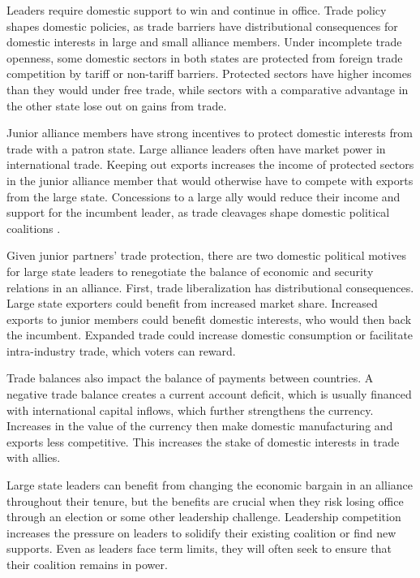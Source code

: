 \documentclass[12pt]{article}
\begin{document}
Leaders require domestic support to win and continue in office.
Trade policy shapes domestic policies, as trade barriers have distributional consequences for domestic interests in large and small alliance members.
Under incomplete trade openness, some domestic sectors in both states are protected from foreign trade competition by tariff or non-tariff barriers. 
Protected sectors have higher incomes than they would under free trade, while sectors with a comparative advantage in the other state lose out on gains from trade. 


Junior alliance members have strong incentives to protect domestic interests from trade with a patron state. 
Large alliance leaders often have market power in international trade. 
Keeping out exports increases the income of protected sectors in the junior alliance member that would otherwise have to compete with exports from the large state.
Concessions to a large ally would reduce their income and support for the incumbent leader, as trade cleavages shape domestic political coalitions \citep{Rogowski1987, Hiscox2001}. 


Given junior partners' trade protection, there are two domestic political motives for large state leaders to renegotiate the balance of economic and security relations in an alliance. 
First, trade liberalization has distributional consequences.
Large state exporters could benefit from increased market share.
Increased exports to junior members could benefit domestic interests, who would then back the incumbent. 
Expanded trade could increase domestic consumption or facilitate intra-industry trade, which voters can reward. 


% 
Trade balances also impact the balance of payments between countries.
A negative trade balance creates a current account deficit, which is usually financed with international capital inflows, which further strengthens the currency. 
Increases in the value of the currency then make domestic manufacturing and exports less competitive. 
This increases the stake of domestic interests in trade with allies. 


%  
Large state leaders can benefit from changing the economic bargain in an alliance throughout their tenure, but the benefits are crucial when they risk losing office through an election or some other leadership challenge. 
Leadership competition increases the pressure on leaders to solidify their existing coalition or find new supports. 
Even as leaders face term limits, they will often seek to ensure that their coalition remains in power. 
\end{document}
